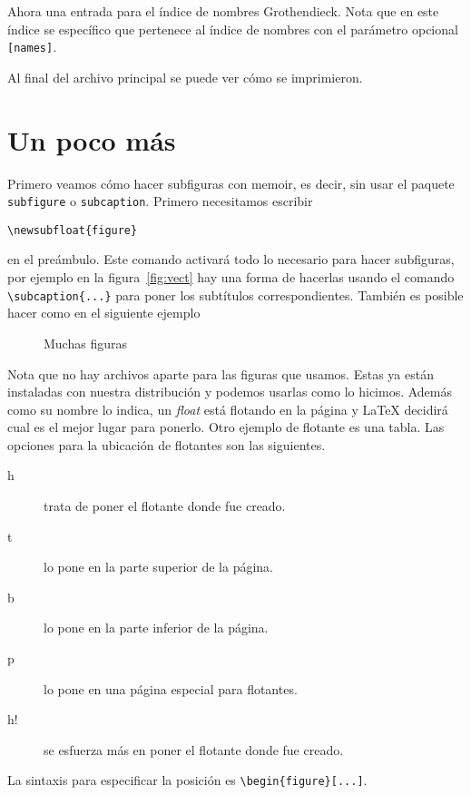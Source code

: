 Ahora una entrada para el índice de nombres
Grothendieck. Nota que en este índice se
específico que pertenece al índice de nombres con el parámetro opcional
\texttt{[names]}.

Al final del archivo principal se puede ver cómo se imprimieron.


\section{Un poco más}
Primero veamos cómo hacer subfiguras con memoir, es decir, sin usar el paquete
\texttt{subfigure} o \texttt{subcaption}. Primero necesitamos escribir
\begin{flushleft}
  \verb|\newsubfloat{figure}|
\end{flushleft}
en el preámbulo. Este comando activará todo lo necesario para hacer
subfiguras, por ejemplo en la figura~\ref{fig:vect} hay
una forma de hacerlas usando el comando \verb|\subcaption{...}| para poner
los subtítulos correspondientes. También es posible hacer como en el
siguiente ejemplo
\begin{figure}
  \centering
  \caption{Muchas figuras}
\end{figure}
Nota que no hay archivos aparte para las figuras que usamos. Estas ya están
instaladas con nuestra distribución y podemos usarlas como lo hicimos.
Además como su nombre lo indica, un \textit{float} está flotando en la
página y \LaTeX{} decidirá cual es el mejor lugar para ponerlo. Otro ejemplo
de flotante es una tabla. Las opciones para la ubicación de flotantes son
las siguientes.
\begin{description}
  \item [h] trata de poner el flotante donde fue creado.
  \item [t] lo pone en la parte superior de la página.
  \item [b] lo pone en la parte inferior de la página.
  \item [p] lo pone en una página especial para flotantes.
  \item [h!] se esfuerza más en poner el flotante donde fue creado.
\end{description}
La sintaxis para especificar la posición es \verb|\begin{figure}[...]|.

